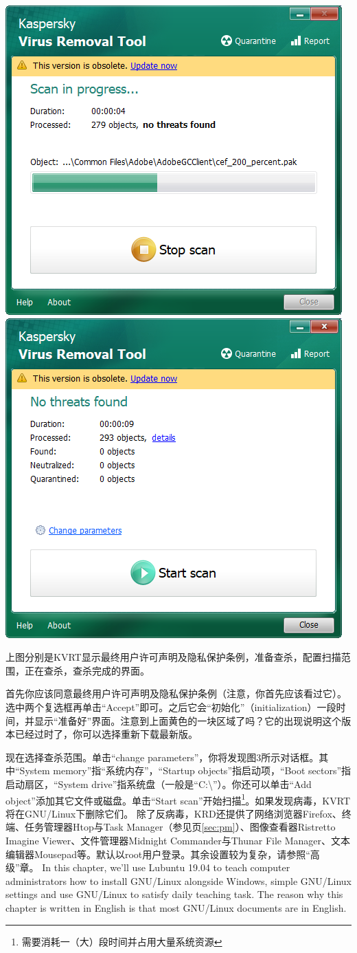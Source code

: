 \begin{center}
	\includegraphics[width=0.7\linewidth]{pic/kvrt_ing.PNG}    \includegraphics[width=0.7\linewidth]{pic/kvrt_compl.PNG}
\end{center} \par
上图分别是KVRT显示最终用户许可声明及隐私保护条例，准备查杀，配置扫描范围，正在查杀，查杀完成的界面。\par
首先你应该同意最终用户许可声明及隐私保护条例（注意，你首先应该看过它）。选中两个复选框再单击“Accept”即可。之后它会“初始化”（initialization）一段时间，并显示“准备好”界面。注意到上面黄色的一块区域了吗？它的出现说明这个版本已经过时了，你可以选择重新下载最新版。\par
现在选择查杀范围。单击“change parameters”，你将发现图3所示对话框。其中“System memory”指“系统内存”，“Startup objects”指启动项，“Boot sectors”指启动扇区，“System drive”指系统盘（一般是“C:\textbackslash”）。你还可以单击“Add object”添加其它文件或磁盘。单击“Start scan”开始扫描\footnote{需要消耗一（大）段时间并占用大量系统资源}。如果发现病毒，KVRT将在GNU/Linux下删除它们。
除了反病毒，KRD还提供了网络浏览器Firefox、终端、任务管理器Htop与Task Manager（参见\pageref{sec:pm}页\ref{sec:pm}）、图像查看器Ristretto Imagine Viewer、文件管理器Midnight Commander与Thunar File Manager、文本编辑器Mousepad等。默认以root用户登录。其余设置较为复杂，请参照“高级”章。
In this chapter, we'll use Lubuntu 19.04 to teach computer administrators how to install GNU/Linux alongside Windows, simple GNU/Linux settings and use GNU/Linux to satisfy daily teaching task. The reason why this chapter is written in English is that most GNU/Linux documents are in English.\par
